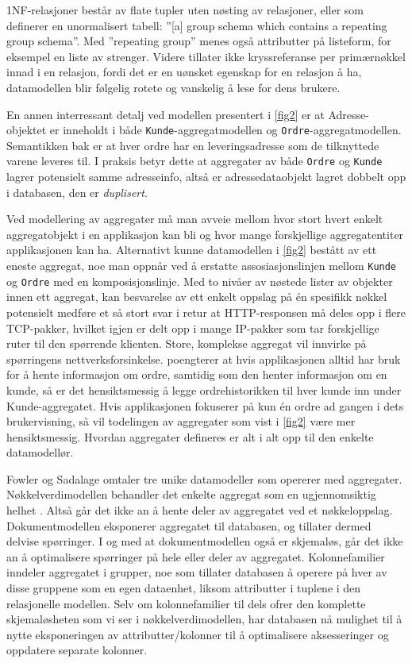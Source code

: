 1NF-relasjoner består av flate tupler uten nøsting av relasjoner, eller som \cite{codd1971} definerer en unormalisert tabell: ''[a] group schema which contains a repeating group schema''. Med ''repeating group'' menes også attributter på listeform, for eksempel en liste av strenger. Videre tillater ikke \cite{codd1971} kryssreferanse per primærnøkkel innad i en relasjon, fordi det er en uønsket egenskap for en relasjon å ha, datamodellen blir følgelig rotete og vanskelig å lese for dens brukere.

En annen interressant detalj ved modellen presentert i \ref{fig2} er at Adresse-objektet er inneholdt i både \texttt{Kunde}-aggregatmodellen og \texttt{Ordre}-aggregatmodellen. Semantikken bak er at hver ordre har en leveringsadresse som de tilknyttede varene leveres til. I praksis betyr dette at aggregater av både \texttt{Ordre} og \texttt{Kunde} lagrer potensielt samme adresseinfo, altså er adressedataobjekt lagret dobbelt opp i databasen, den er \emph{duplisert}.

Ved modellering av aggregater må man avveie mellom hvor stort hvert enkelt aggregatobjekt i en applikasjon kan bli og hvor mange forskjellige aggregatentiter applikasjonen kan ha. Alternativt kunne datamodellen i \ref{fig2} bestått av ett eneste aggregat, noe man oppnår ved å erstatte assosiasjonslinjen mellom \texttt{Kunde} og \texttt{Ordre} med en komposisjonslinje. Med to nivåer av nøstede lister av objekter innen ett aggregat, kan besvarelse av ett enkelt oppslag på én spesifikk nøkkel potensielt medføre et så stort svar i retur at HTTP-responsen må deles opp i flere TCP-pakker, hvilket igjen er delt opp i mange IP-pakker som tar forskjellige ruter til den spørrende klienten. Store, komplekse aggregat vil innvirke på spørringens nettverksforsinkelse. \cite{sadalage2013} poengterer at hvis applikasjonen alltid har bruk for å hente informasjon om ordre, samtidig som den henter informasjon om en kunde, så er det hensiktsmessig å legge ordrehistorikken til hver kunde inn under Kunde-aggregatet. Hvis applikasjonen fokuserer på kun én ordre ad gangen i dets brukervisning, så vil todelingen av aggregater som vist i \ref{fig2} være mer hensiktsmessig. Hvordan aggregater defineres er alt i alt opp til den enkelte datamodellør.

Fowler og Sadalage omtaler tre unike datamodeller som opererer med aggregater. Nøkkel\-verdi\-modellen behandler det enkelte aggregat som en ugjennomsiktig helhet \citep{sadalage2013}. Altså går det ikke an å hente deler av aggregatet ved et nøkkeloppslag. Dokumentmodellen eksponerer aggregatet til databasen, og tillater dermed delvise spørringer. I og med at dokumentmodellen også er skjemaløs, går det ikke an å optimalisere spørringer på hele eller deler av aggregatet. Kolonnefamilier inndeler aggregatet i grupper, noe som tillater databasen å operere på hver av disse gruppene som en egen dataenhet, liksom attributter i tuplene i den relasjonelle modellen. Selv om kolonnefamilier til dels ofrer den komplette skjemaløsheten som vi ser i nøkkel\-verdi\-modellen, har databasen nå mulighet til å nytte eksponeringen av attributter/kolonner til å optimalisere aksesseringer og oppdatere separate kolonner.

